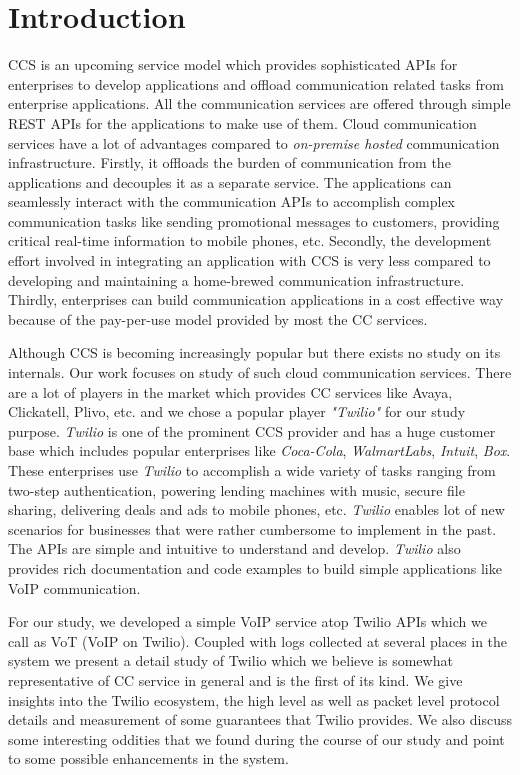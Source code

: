 \section{Introduction}
\label{sec-intro}
CCS is an upcoming service model which provides sophisticated APIs for enterprises to develop applications and offload communication related tasks from enterprise applications. 
All the communication services are offered through simple REST APIs for the applications to make use of them. Cloud communication services have a lot of advantages compared to \textit{on-premise hosted} communication infrastructure. Firstly, it offloads the burden of communication from the applications and decouples it as a separate service. The applications can seamlessly interact with the communication APIs to accomplish complex communication tasks like sending promotional messages to customers, providing critical real-time information to mobile phones, etc. Secondly, the development effort involved in integrating an application with CCS is very less compared to developing and maintaining a home-brewed communication infrastructure.
Thirdly, enterprises can build communication applications in a cost effective way because of the pay-per-use model provided by most the CC services. 

Although CCS is becoming increasingly popular but there exists no study on its internals. Our work focuses on study of such cloud communication services. There are a lot of players in the market which provides CC services like Avaya, Clickatell, Plivo, etc. and we chose a popular player \textit{"Twilio"} for our study purpose. \textit{Twilio} is one of the prominent CCS provider and has a huge customer base which includes popular enterprises like \textit{Coca-Cola}, \textit{WalmartLabs}, \textit{Intuit}, \textit{Box}. These enterprises use \textit{Twilio} to accomplish a wide variety of tasks ranging from two-step authentication, powering lending machines with music, secure file sharing, delivering deals and ads to mobile phones, etc. \textit{Twilio} enables lot of new scenarios for businesses that were rather cumbersome to implement in the past. 
The APIs are simple and intuitive to understand and develop. \textit{Twilio} also provides rich documentation and code examples to build simple applications like VoIP communication.

 For our study, we developed a simple VoIP service atop Twilio APIs which we call as VoT (VoIP on Twilio). Coupled with logs collected at several places in the system we present a detail study of Twilio which we believe is somewhat representative of CC service in general and is the first of its kind. We give insights into the Twilio ecosystem, the high level as well as packet level protocol details and measurement of some guarantees that Twilio provides. We also discuss some interesting oddities that we found during the course of our study and point to some possible enhancements in the system.
 
